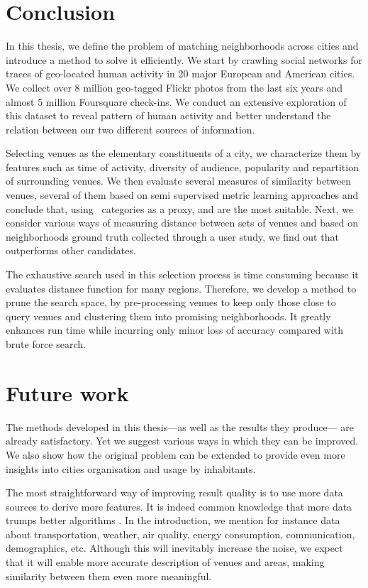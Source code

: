 \section{Conclusion}
\label{sec:cconc}

In this thesis, we define the problem of matching neighborhoods across cities
and introduce a method to solve it efficiently. We start by crawling social
networks for traces of geo-located human activity in 20 major European and
American cities. We collect over 8 million geo-tagged Flickr photos from the
last six years and almost 5 million Foursquare check-ins. We conduct an
extensive exploration of this dataset to reveal pattern of human activity and
better understand the relation between our two different sources of
information.

Selecting venues as the elementary constituents of a city, we characterize
them by features such as time of activity, diversity of audience, popularity
and repartition of surrounding venues. We then evaluate several measures of
similarity between venues, several of them based on semi supervised metric
learning approaches and conclude that, using \fs\ categories as a proxy,
\eucl{} and \lmnn{} are the most suitable. Next, we consider various ways of
measuring distance between sets of venues and based on neighborhoods ground
truth collected through a user study, we find out that \emd{} outperforms
other candidates.

The exhaustive search used in this selection process is time consuming because
it evaluates distance function for many regions. Therefore, we develop a
method to prune the search space, by pre-processing venues to keep only those
close to query venues and clustering them into promising neighborhoods. It
greatly enhances run time while incurring only minor loss of accuracy compared
with brute force search.

\section{Future work}
\label{sec:cfuture}

The methods developed in this thesis---as well as the results they produce---
are already satisfactory. Yet we suggest various ways in which they can be
improved. We also show how the original problem can be extended to provide
even more insights into cities organisation and usage by inhabitants.

\medskip

The most straightforward way of improving result quality is to use more data
sources to derive more features. It is indeed common knowledge that more data
trumps better algorithms \autocite{MoreData09}. In the introduction, we mention
for instance data about transportation, weather, air quality, energy
consumption, communication, demographics, etc. Although this will inevitably
increase the noise, we expect that it will enable more accurate description of
venues and areas, making similarity between them even more meaningful.

